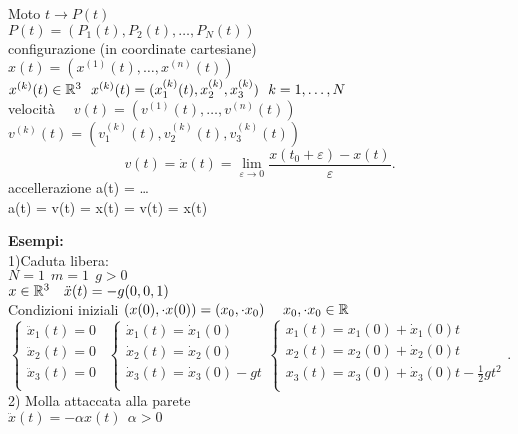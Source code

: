 \documentclass{article}
\begin{document}
	\begin{nota}
		Moto $t \rightarrow P(t)$\\
		$P(t) = (P_1(t), P_2(t), \ldots,P_N(t))$\\
		configurazione (in coordinate cartesiane)\\
		$x(t) = (x^{(1)}(t),\ldots,x^{(n)}(t))$\\
		$x^{(k)}(t)\in \mathbb{R}^3\ \ x^{(k)}(t) = (x_1^{(k)}(t), x_2^{(k)},x_3^{(k)})\ \ k = 1,\ldots, N$\\
		velocità \ \ $v(t) = (v^{(1)}(t), \ldots, v^{(n)}(t))$ \ \  $v^{(k)}(t) = (v_1^{(k)}(t), v_2^{(k)}(t), v_3^{(k)}(t))$\\
		 \[
			 v(t) = \dot x(t)  = \lim_{\varepsilon \rightarrow 0}\frac{x(t_0 + \varepsilon) - x(t)}{\varepsilon}
		.\] 
		accellerazione a(t) = \ldots\\
		a(t) = \dot v(t)  = \ddot x(t) = v(t) = x(t)
	\end{nota}
	\textbf{Esempi:}\\
	1)Caduta libera:\\
	$N = 1\ \ m =1 \ \ g > 0$\\
	 $x\in \mathbb{R}^3 \ \ \ \ddot x(t) = -g(0,0,1)$\\
	 Condizioni iniziali $(x(0),\cdot x(0)) = (x_0,\cdot x_0)\ \ \ \ x_0,\cdot x_0 \in \mathbb{R}$\\
	 \[
	 \begin{cases}
	 	\ddot x_1(t) = 0\\
	 	\ddot x_2(t) = 0\\
	 	\ddot x_3(t) = 0\\
	 \end{cases} \ \ 
	 \begin{cases}
	 	\dot x_1(t) = \dot x_1(0)\\
	 	\dot x_2(t) = \dot x_2(0)\\
	 	\dot x_3(t) =\dot x_3(0) - gt\\
	 \end{cases}
	 \begin{cases}
	 	x_1(t) = x_1(0) +\dot x_1(0)t\\
	 	x_2(t) = x_2(0) +\dot x_2(0)t\\
	 	x_3(t) =x_3(0) +\dot x_3(0)t - \frac 12gt^2\\
	 \end{cases}
	 .\] 
	 2) Molla attaccata alla parete\\
	 $\ddot x(t) = -\alpha x (t) \ \ \alpha > 0$\\
\end{document}
